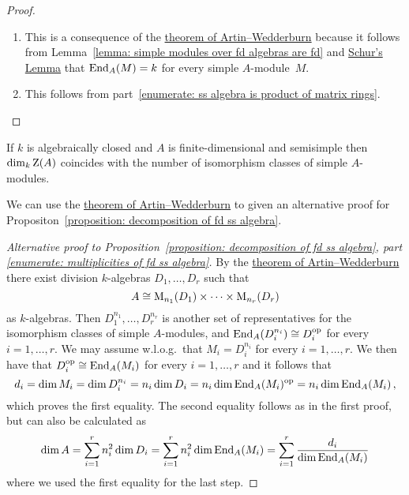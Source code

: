 \begin{proof}
  \leavevmode
  \begin{enumerate}
    \item
      This is a consequence of the \hyperref[theorem: artin wedderburn theorem]{theorem of Artin--Wedderburn} because it follows from Lemma~\ref{lemma: simple modules over fd algebras are fd} and \hyperref[proposition: schurs lemma for modules]{Schur’s Lemma} that $\operatorname{End}_A(M) = k$ for every simple $A$-module~$M$.
    \item
      This follows from part~\ref*{enumerate: ss algebra is product of matrix rings}.
    \qedhere
  \end{enumerate}
\end{proof}


\begin{corollary}
  \label{corollary: dimension of center is number of simple modules}
  If $k$ is algebraically closed and $A$ is finite-dimensional and semisimple then $\dim_k \operatorname{Z}(A)$ coincides with the number of isomorphism classes of simple $A$-modules.
\end{corollary}




\begin{fluff}
  We can use the \hyperref[theorem: artin wedderburn theorem]{theorem of Artin--Wedderburn} to given an alternative proof for Propositon~\ref{proposition: decomposition of fd ss algebra}.
\end{fluff}


\begin{proof}[Alternative proof to Proposition~\ref*{proposition: decomposition of fd ss algebra}, part \ref*{enumerate: multiplicities of fd ss algebra}]
  By the \hyperref[theorem: artin wedderburn theorem]{theorem of Artin--Wedderburn} there exist division $k$-algebras $D_1, \dotsc, D_r$ such that
  \[
          A
    \cong \operatorname{M}_{n_1}(D_1) \times \dotsb \times \operatorname{M}_{n_r}(D_r)
  \]
  as $k$-algebras.
  Then $D_1^{n_1}, \dotsc, D_r^{n_r}$ is another set of representatives for the isomorphism classes of simple $A$-modules, and $\operatorname{End}_A(D_i^{n_i}) \cong D_i^{\operatorname{op}}$ for every $i = 1, \dotsc, r$.
  We may assume w.l.o.g.\ that $M_i = D_i^{n_i}$ for every $i = 1, \dotsc, r$.
  We then have that $D_i^{\operatorname{op}} \cong \operatorname{End}_A(M_i)$ for every $i = 1, \dotsc, r$ and it follows that
  \[
      d_i
    = \dim M_i
    = \dim D_i^{n_i}
    = n_i \dim D_i
    = n_i \dim \operatorname{End}_A(M_i)^{\operatorname{op}}
    = n_i \dim \operatorname{End}_A(M_i) \,,
  \]
  which proves the first equality.
  The second equality follows as in the first proof, but can also be calculated as
  \[
      \dim A
    = \sum_{i=1}^r n_i^2 \dim D_i
    = \sum_{i=1}^r n_i^2 \dim \operatorname{End}_A(M_i)
    = \sum_{i=1}^r \frac{d_i}{\dim \operatorname{End}_A(M_i)}
  \]
  where we used the first equality for the last step.
\end{proof}


